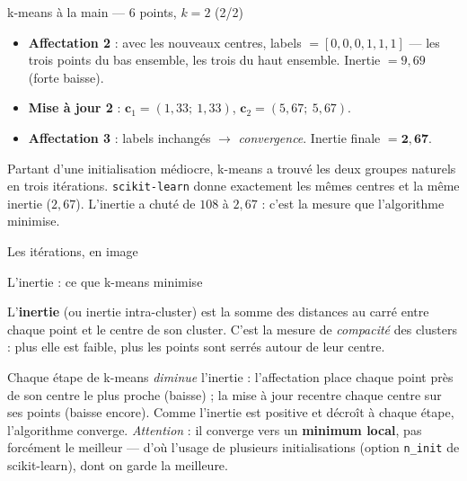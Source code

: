 \documentclass[aspectratio=169,11pt]{beamer}
\newcommand{\vx}{\mathbf{x}}
\newcommand{\vc}{\mathbf{c}}
\begin{document}
\begin{frame}{k-means à la main — 6 points, $k=2$ (2/2)}
\begin{ucadex}
{\small \begin{itemize}
  \item \textbf{Affectation 2} : avec les nouveaux centres, labels $= [0,0,0,1,1,1]$ — les trois points du bas ensemble, les trois du haut ensemble. Inertie $= 9{,}69$ (forte baisse).
  \item \textbf{Mise à jour 2} : $\vc_1 = (1{,}33;\ 1{,}33)$, $\vc_2 = (5{,}67;\ 5{,}67)$.
  \item \textbf{Affectation 3} : labels inchangés $\to$ \emph{convergence}. Inertie finale $= \mathbf{2{,}67}$.
\end{itemize}
Partant d'une initialisation médiocre, k-means a trouvé les deux groupes naturels en trois itérations. \texttt{scikit-learn} donne exactement les mêmes centres et la même inertie ($2{,}67$). L'inertie a chuté de $108$ à $2{,}67$ : c'est la mesure que l'algorithme minimise.}
\end{ucadex}
\end{frame}

\begin{frame}{Les itérations, en image}
\end{frame}

\begin{frame}{L'inertie : ce que k-means minimise}
\begin{ucaddef}[Définition]
{\small L'\textbf{inertie} (ou inertie intra-cluster) est la somme des distances au carré entre chaque point et le centre de son cluster. C'est la mesure de \emph{compacité} des clusters : plus elle est faible, plus les points sont serrés autour de leur centre.}
\end{ucaddef}
\ucadformula{\mathcal{I} = \sum_{k=1}^{K}\sum_{i \in C_k} \lVert \vx_i - \vc_k \rVert^2}
{\small Chaque étape de k-means \emph{diminue} l'inertie : l'affectation place chaque point près de son centre le plus proche (baisse) ; la mise à jour recentre chaque centre sur ses points (baisse encore). Comme l'inertie est positive et décroît à chaque étape, l'algorithme converge. \emph{Attention} : il converge vers un \textbf{minimum local}, pas forcément le meilleur — d'où l'usage de plusieurs initialisations (option \texttt{n\_init} de scikit-learn), dont on garde la meilleure.}
\end{frame}
\end{document}

